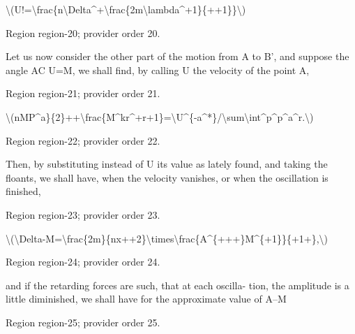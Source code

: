 \documentclass[11pt]{article}
\begin{document}
\textbackslash{}(U!=\textbackslash{}frac\{n\textbackslash{}Delta\textasciicircum{}+\textbackslash{}frac\{2m\textbackslash{}lambda\textasciicircum{}+1\}\{++1\}\}\textbackslash{})
\par

{\scriptsize\color{gray} Region region-20; provider order 20.\par}
\medskip

Let us now consider the other part of the motion from A to B’, and suppose the angle AC U=M, we shall find, by calling U the velocity of the point A,
\par

{\scriptsize\color{gray} Region region-21; provider order 21.\par}
\medskip

\textbackslash{}(nMP\textasciicircum{}a\}\{2\}++\textbackslash{}frac\{M\textasciicircum{}kr\textasciicircum{}+r+1\}=\textbackslash{}U\textasciicircum{}\{-a\textasciicircum{}*\}/\textbackslash{}sum\textbackslash{}int\textasciicircum{}p\textasciicircum{}p\textasciicircum{}a\textasciicircum{}r.\textbackslash{})
\par

{\scriptsize\color{gray} Region region-22; provider order 22.\par}
\medskip

Then, by substituting instead of U its value as lately found, and taking the floants, we shall have, when the velocity vanishes, or when the oscillation is finished,
\par

{\scriptsize\color{gray} Region region-23; provider order 23.\par}
\medskip

\textbackslash{}(\textbackslash{}Delta-M=\textbackslash{}frac\{2m\}\{nx++2\}\textbackslash{}times\textbackslash{}frac\{A\textasciicircum{}\{+++\}M\textasciicircum{}\{+1\}\}\{+1+\},\textbackslash{})
\par

{\scriptsize\color{gray} Region region-24; provider order 24.\par}
\medskip

and if the retarding forces are such, that at each oscilla- tion, the amplitude is a little diminished, we shall have for the approximate value of A--M
\par

{\scriptsize\color{gray} Region region-25; provider order 25.\par}
\medskip
\end{document}
